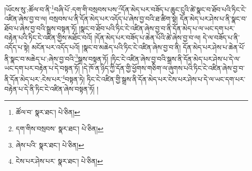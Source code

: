 །ཡོངས་སུ་:ཚོལ་བ་ནི་\footnote{ཚོལ་བ་  སྣར་ཐང་།  པེ་ཅིན། }བཞི་པོ་:དག་གི་བསྲབས་པས་\footnote{དག་གིས་བསྲབས་  སྣར་ཐང་།  པེ་ཅིན། }དོན་མེད་པར་བཟོད་པ་ཆུང་ངུའི་ཚེ་སྣང་བ་ཐོབ་པའི་ཏིང་ངེ་འཛིན་ཞེས་བྱ་བ་ལ། བསྲབས་པ་ནི་དོན་མེད་པར་འདོད་པ་ཞེས་བྱ་བའི་ཐ་ཚིག་སྟེ། དོན་མེད་པར་ཤེས་པ་ནི་སྣང་བ་ཐོབ་པ་ཞེས་བྱ་བའི་སྒྲས་བསྟན་ཏོ། །སྣང་བ་ཐོབ་པའི་ཏིང་ངེ་འཛིན་ཞེས་བྱ་བ་ནི་དོན་མེད་པ་ལ་ཡང་དག་པར་བརྟེན་པའི་ཏིང་ངེ་འཛིན་གྱིས་མཐོང་བའོ། །དོན་མེད་པར་བཟོད་པ་ཆེན་པོའི་ཚེ་ཞེས་བྱ་བ་ལ། དེ་ལ་བཟོད་པ་ནི་འདོད་པ་སྟེ། མངོན་པར་འདོད་པའོ། །སྣང་བ་མཆེད་པའི་ཏིང་ངེ་འཛིན་ཞེས་བྱ་བ་ནི། དོན་མེད་པར་ཤེས་པ་ཆེན་པོ་ནི་སྣང་བ་མཆེད་པ་:ཞེས་བྱ་བའི་\footnote{ཞེས་པའི་  སྣར་ཐང་།  པེ་ཅིན། }སྒྲས་བསྟན་ཏོ། །ཏིང་ངེ་འཛིན་ཞེས་བྱ་བའི་སྒྲས་ནི་དོན་མེད་པར་ཤེས་པ་དེ་ལ་ཡང་དག་པར་བརྟེན་པ་དེ་བསྟན་ཏོ། །དེ་ཁོ་ན་ཉིད་ཀྱི་དོན་གྱི་ཕྱོགས་གཅིག་ལ་ཞུགས་པའི་ཏིང་ངེ་འཛིན་ཞེས་བྱ་བ་ནི་དོན་མེད་པར་:ངེས་པར་\footnote{ངེས་པར་ཤེས་པར་  སྣར་ཐང་།  པེ་ཅིན། }བསྟན་ཏེ། ཏིང་ངེ་འཛིན་གྱི་སྒྲས་ནི་དོན་མེད་པར་ངེས་པར་ཤེས་པ་དེ་ལ་ཡང་དག་པར་བརྟེན་པ་དེ་ནི་ཏིང་ངེ་འཛིན་ཞེས་བསྟན་ཏོ། །
